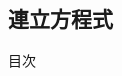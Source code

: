 \documentclass[aspectratio=169, dvipdfmx, 11pt]{beamer} %
\begin{document}
\subsection{連立方程式}
\begin{frame}{目次}
	\tableofcontents[currentsubsection]
\end{frame}



%
%
%
%
\end{document}
